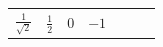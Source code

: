{\begin{tabular}[t]{|l|l|l|l|l|l|l|}
                  $\frac{1}{\sqrt{2}}$
                 &
                  $\frac{1}{2}$
                 &
        0 &
                  $-1$
     \tabularnewline\cline{1-1}\cline{2-2}\cline{3-3}\cline{4-4}\cline{5-5}\cline{6-6}\cline{7-7}
    \end{tabular}} %
        \addtolength{\mytableboxheight}{\mytableboxdepth}
